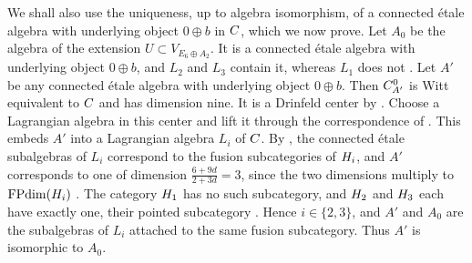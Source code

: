 \documentclass[leqno]{article}
\let\cal\relax
\newcommand{\cal}{\mathcal}
\numberwithin{equation}{section}
\begin{document}
We shall also use the uniqueness, up to algebra isomorphism, of a connected \'etale algebra with underlying object $0\oplus b$ in $\cal C$, which we now prove. Let $A_0$ be the algebra of the extension $U \subset V_{E_6\oplus A_2}$. It is a connected \'etale algebra with underlying object $0\oplus b$, and $L_2$ and $L_3$ contain it, whereas $L_1$ does not \cite[Proposition 3.5(3) p.~17]{Arh26b}. Let $A'$ be any connected \'etale algebra with underlying object $0\oplus b$. Then $\cal C_{A'}^0$ is Witt equivalent to $\cal C$ and has dimension nine. It is a Drinfeld center by \cite[Propositions 5.4 and 5.8 pp.~22--23]{DMNO13}. Choose a Lagrangian algebra in this center and lift it through the correspondence of \cite[Proposition 3.16 p.~12]{DMNO13}. This embeds $A'$ into a Lagrangian algebra $L_i$ of $\cal C$. By \cite[Theorem 4.10 p.~18]{DMNO13}, the connected \'etale subalgebras of $L_i$ correspond to the fusion subcategories of $\cal H_i$, and $A'$ corresponds to one of dimension $\frac{6+9d}{2+3d} = 3$, since the two dimensions multiply to $\operatorname{FPdim}(\cal H_i)$ \cite[Proposition 2.2(3) p.~10]{Arh26b}. The category $\cal H_1$ has no such subcategory, and $\cal H_2$ and $\cal H_3$ each have exactly one, their pointed subcategory \cite[Proposition 2.1(4) p.~9]{Arh26b}. Hence $i \in \{2,3\}$, and $A'$ and $A_0$ are the subalgebras of $L_i$ attached to the same fusion subcategory. Thus $A'$ is isomorphic to $A_0$.
\end{document}
